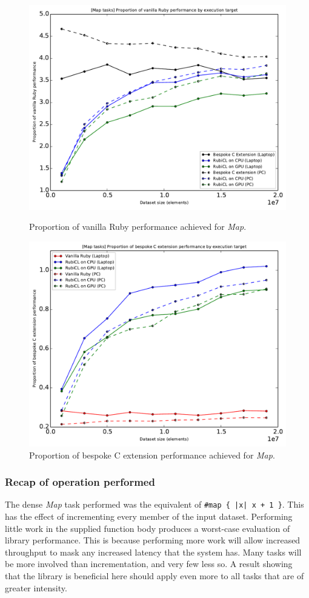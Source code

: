 \begin{figure}[H]
  \centering
  \includegraphics[width=\textwidth]{./graphing/just_map/prop_van.pdf}
  \caption{Proportion of vanilla Ruby performance achieved for \emph{Map}.}
  \label{fig:map_task_vperf_g}

  \includegraphics[width=\textwidth]{./graphing/just_map/prop_bes.pdf}
  \caption{Proportion of bespoke C extension performance achieved for \emph{Map}.}
  \label{fig:map_task_bperf_g}
\end{figure}
\subsubsection{Recap of operation performed}
The dense \emph{Map} task performed was the equivalent of \verb!#map { |x| x + 1 }!. This has the effect of incrementing every member of the input dataset.
Performing little work in the supplied function body produces a worst-case evaluation of library performance. This is because performing more work will allow increased throughput to mask any increased latency that the system has. Many tasks will be more involved than incrementation, and very few less so. A result showing that the library is beneficial here should apply even more to all tasks that are of greater intensity.

